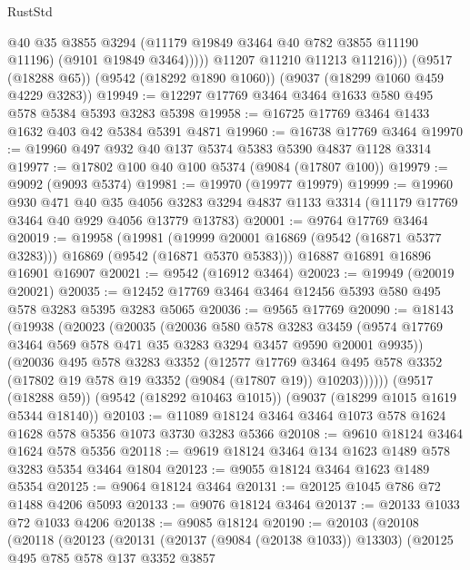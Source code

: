 \begin{lexlean}{RustStd}
\begin{coremodule}
                  @40
                  @35
                  @3855
                  @3294
                  (@11179 @19849 @3464 @40 @782 @3855 @11190 @11196)
                  (@9101 @19849 @3464)))))
          @11207
          @11210
          @11213
          @11216)))
    (@9517 (@18288 @65))
    (@9542 (@18292 @1890 @1060))
    (@9037 (@18299 @1060 @459 @4229 @3283))
@19949 := @12297 @17769 @3464 @3464 @1633 @580 @495 @578 @5384 @5393 @3283 @5398
@19958 := @16725 @17769 @3464 @1433 @1632 @403 @42 @5384 @5391 @4871
@19960 := @16738 @17769 @3464
@19970 := @19960 @497 @932 @40 @137 @5374 @5383 @5390 @4837 @1128 @3314
@19977 := @17802 @100 @40 @100 @5374 (@9084 (@17807 @100))
@19979 := @9092 (@9093 @5374)
@19981 := @19970 (@19977 @19979)
@19999 := @19960
    @930
    @471
    @40
    @35
    @4056
    @3283
    @3294
    @4837
    @1133
    @3314
    (@11179 @17769 @3464 @40 @929 @4056 @13779 @13783)
@20001 := @9764 @17769 @3464
@20019 := @19958
    (@19981 (@19999 @20001 @16869 (@9542 (@16871 @5377 @3283))) @16869 (@9542 (@16871 @5370 @5383)))
    @16887
    @16891
    @16896
    @16901
    @16907
@20021 := @9542 (@16912 @3464)
@20023 := @19949 (@20019 @20021)
@20035 := @12452 @17769 @3464 @3464 @12456 @5393 @580 @495 @578 @3283 @5395 @3283 @5065
@20036 := @9565 @17769
@20090 := @18143
    (@19938
      (@20023
        (@20035
          (@20036
            @580
            @578
            @3283
            @3459
            (@9574 @17769 @3464 @569 @578 @471 @35 @3283 @3294 @3457 @9590 @20001 @9935))
          (@20036
            @495
            @578
            @3283
            @3352
            (@12577
              @17769
              @3464
              @495
              @578
              @3352
              (@17802 @19 @578 @19 @3352 (@9084 (@17807 @19)) @10203))))))
    (@9517 (@18288 @59))
    (@9542 (@18292 @10463 @1015))
    (@9037 (@18299 @1015 @1619 @5344 @18140))
@20103 := @11089 @18124 @3464 @3464 @1073 @578 @1624 @1628 @578 @5356 @1073 @3730 @3283 @5366
@20108 := @9610 @18124 @3464 @1624 @578 @5356
@20118 := @9619 @18124 @3464 @134 @1623 @1489 @578 @3283 @5354 @3464 @1804
@20123 := @9055 @18124 @3464 @1623 @1489 @5354
@20125 := @9064 @18124 @3464
@20131 := @20125 @1045 @786 @72 @1488 @4206 @5093
@20133 := @9076 @18124 @3464
@20137 := @20133 @1033 @72 @1033 @4206
@20138 := @9085 @18124
@20190 := @20103
    (@20108
      (@20118
        (@20123
          (@20131
            (@20137 (@9084 (@20138 @1033)) @13303)
            (@20125
              @495
              @785
              @578
              @137
              @3352
              @3857

\end{coremodule}
\end{lexlean}
